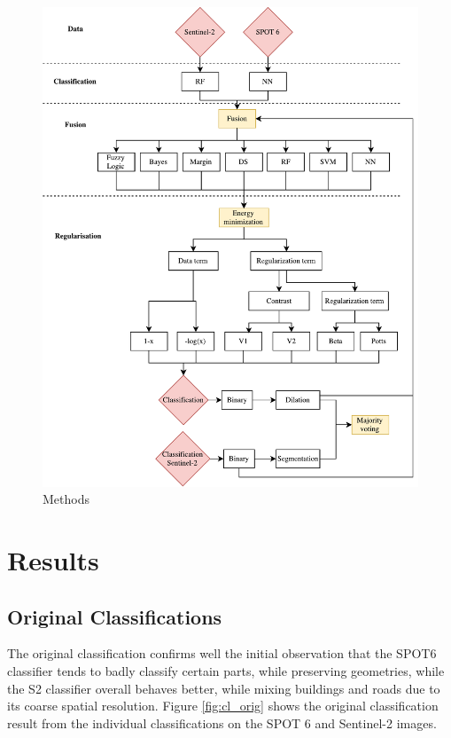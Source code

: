\documentclass[10pt]{article}
\begin{document}
\begin{figure}[H]
    \centering
    \includegraphics[width=.7\textwidth]{IGN-methods}
    \caption{Methods}
    \label{fig:methods}
\end{figure}

\newpage

\section{Results}
\subsection{Original Classifications}
The original classification confirms well the initial observation that the SPOT6 classifier tends to badly classify certain parts, while preserving geometries, while the S2 classifier overall behaves better, while mixing buildings and roads due to its coarse spatial resolution. Figure \ref{fig:cl_orig} shows the original classification result from the individual classifications on the SPOT 6 and Sentinel-2 images. \\
\end{document}
